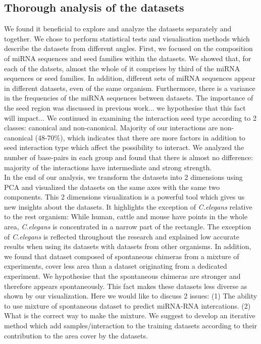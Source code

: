 \documentclass{bmcart}
\begin{document}
\subsection*{Thorough analysis of the datasets}
We found it beneficial to explore and analyze the datasets separately and together. We chose to perform statistical tests and visualisation methods which describe the datasets from different angles.
First, we focused on the composition of miRNA sequences and seed families within the datasets. We showed that, for each of the datsets, almost the whole of it comprises by third of the miRNA sequences or seed families.  In addition, different sets of miRNA sequences appear in different datasets, even of the same organism. Furthermore, there is a variance in the frequencies of the miRNA sequences between datasets.
The importance of the seed region was discussed in previous work... we hypothesise that this fact will impact...
We continued in examining the interaction seed type according to 2 classes: canonical and non-canonical. Majority of our interactions are non-canonical (48-70\%), which indicates that there are more factors in addition to seed interaction type which affect the possibility to interact. We analyzed the number of base-pairs in each group and found that there is almost no difference: majority of the interactions have intermediate and strong strength. \\
In the end of our analysis, we transform the datasets into 2 dimensions using PCA and visualized the datasets on the same axes with the same two components. This 2 dimensions visualization is a powerful tool which gives us new insights about the datasets. It highlights the exception of \textit{C.elegans} relative to the rest organism: While human, cattle and mouse have points in the whole area, \textit{C.elegans} is concentrated in a narrow part of the rectangle. The exception of 
\textit{C.elegans} is reflected throughout the research and explained low accurate results when using its datasets with datasets from other organisms.
In addition, we found that dataset composed of spontaneous chimeras from a mixture of experiments, cover less area than a dataset originating from a dedicated experiment. We hypothesise that the spontaneous chimeras are stronger and therefore appears spontaneously. This fact makes these datasets less diverse as shown by our visualization. Here we would like to discuss 2 issues: (1) The ability to use mixture of spontaneous dataset to predict miRNA-RNA intercations. (2) What is the correct way to make the mixture. We suggest to develop an iterative method which add samples/interaction to the training datasets according to their contribution to the area cover by the datasets. 
\end{document}
